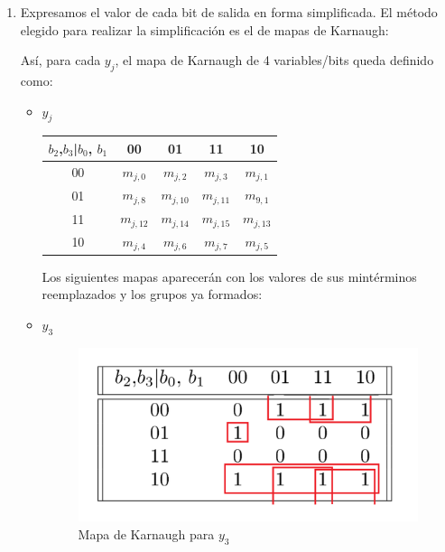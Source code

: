 \documentclass[../../informe/src/main.tex]{subfiles}
\begin{document}
\begin{enumerate}
 \item Expresamos el valor de cada bit de salida en forma simplificada. El método elegido para realizar la simplificación es el de mapas de Karnaugh: \par
 
Así, para cada $y_{j}$, el mapa de Karnaugh de 4 variables/bits queda definido como: 
\begin{itemize} 

\item $y_{j}$
 \begin{table}[H] %
\centering
 \begin{tabular}{||c c c c c||} 
 \hline
$b_{2}$,$b_{3}$|$b_{0}$, $b_{1}$ & 00 & 01 & 11 & 10\\ [0.5ex] 
 \hline\hline
00 & $m_{j,0}$ & $m_{j,2}$ & $m_{j,3}$ & $m_{j,1}$\\
01 & $m_{j,8}$ & $m_{j,10}$ & $m_{j,11}$ & $m_{9,1}$\\
11 & $m_{j,12}$ & $m_{j,14}$ & $m_{j,15}$ & $m_{j,13}$\\
10 & $m_{j,4}$ & $m_{j,6}$ & $m_{j,7}$ & $m_{j,5}$\\[1ex] 
\hline
\end{tabular}
\end{table}
Los siguientes mapas aparecerán con los valores de sus mintérminos reemplazados y los grupos ya formados:

\item $y_3$ 				

\begin{figure}[H]	%
	\centering
	\includegraphics[scale=0.5]{imagenes/karnaugh_mapa_y3.png}
	\caption{Mapa de Karnaugh para $y_3$}
	\label{fig:ej4_karnaugh_mapa_y3}
\end{figure}


\end{itemize}
\end{enumerate}
\end{document}
